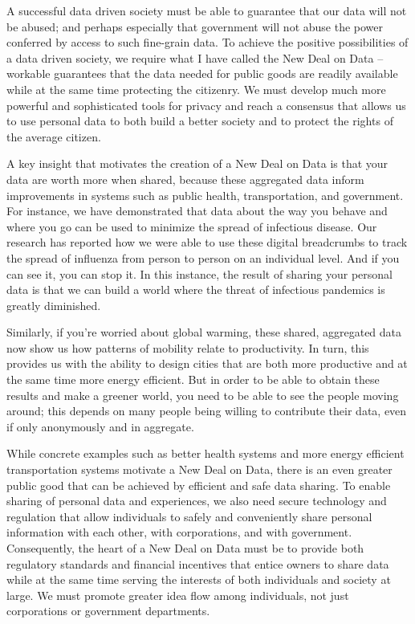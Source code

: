 A successful data driven society must be able to guarantee that our data will not be abused; and perhaps especially that government will not abuse the power conferred by access to such fine-grain data.
To achieve the positive possibilities of a data driven society, we require what I have called the New Deal on Data – workable guarantees that the data needed for public goods are readily available while at the same time protecting the citizenry.
We must develop much more powerful and sophisticated tools for privacy and reach a consensus that allows us to use personal data to both build a better society and to protect the rights of the average citizen.

A key insight that motivates the creation of a New Deal on Data is that your data are worth more when shared, because these aggregated data inform improvements in systems such as public health, transportation, and government.
For instance, we have demonstrated that data about the way you behave and where you go can be used to minimize the spread of infectious disease.
Our research has reported how we were able to use these digital breadcrumbs to track the spread of influenza from person to person on an individual level.
And if you can see it, you can stop it. In this instance, the result of sharing your personal data is that we can build a world where the threat of infectious pandemics is greatly diminished.

Similarly, if you're worried about global warming, these shared, aggregated data now show us how patterns of mobility relate to productivity.
In turn, this provides us with the ability to design cities that are both more productive and at the same time more energy efficient.
But in order to be able to obtain these results and make a greener world, you need to be able to see the people moving around; this depends on many people being willing to contribute their data, even if only anonymously and in aggregate.

While concrete examples such as better health systems and more energy efficient transportation systems motivate a New Deal on Data, there is an even greater public good that can be achieved by efficient and safe data sharing.
To enable sharing of personal data and experiences, we also need secure technology and regulation that allow individuals to safely and conveniently share personal information with each other, with corporations, and with government.
Consequently, the heart of a New Deal on Data must be to provide both regulatory standards and financial incentives that entice owners to share data while at the same time serving the interests of both individuals and society at large.
We must promote greater idea flow among individuals, not just corporations or government departments.

